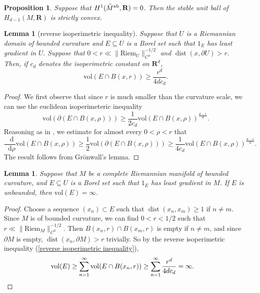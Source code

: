 \documentclass[reqno,11pt]{amsart}
\newcommand{\RR}{\mathbf{R}}
\newcommand*\dif{\mathop{}\!\mathrm{d}}
\DeclareMathOperator{\dist}{dist}
\newcommand{\vol}{\mathrm{vol}}
\newcommand{\Riem}{\mathrm{Riem}}
\newtheorem{lemma}[theorem]{Lemma}
\newtheorem{proposition}[theorem]{Proposition}
\theoremstyle{definition}
\numberwithin{equation}{section}
\begin{document}
\begin{proposition}\label{abelian cover condition}
Suppose that $H^1(\tilde M^{\rm ab}, \RR) = 0$. 
Then the stable unit ball of $H_{d - 1}(M, \RR)$ is strictly convex.
\end{proposition}

\begin{lemma}[reverse isoperimetric inequality]
Suppose that $U$ is a Riemannian domain of bounded curvature and $E \subseteq U$ is a Borel set such that $1_E$ has least gradient in $U$.
Suppose that $0 < r \ll \|\Riem_U\|_{C^0}^{-1/2}$ and $\dist(x, \partial U) > r$.
Then, if $c_d$ denotes the isoperimetric constant on $\RR^d$,
\begin{equation}\label{reverse isoperimetric inequality}
\vol(E \cap B(x, r)) \geq \frac{r^d}{4dc_d}.
\end{equation}
\end{lemma}
\begin{proof}
We first observe that since $r$ is much smaller than the curvature scale, we can use the euclidean isoperimeteric inequality 
$$\vol(\partial(E \cap B(x, \rho))) \geq \frac{1}{2c_d} \vol(E \cap B(x, \rho))^{\frac{d - 1}{d}}.$$
Reasoning as in \cite[Proposition 5.14]{Giusti77}, we estimate for almost every $0 < \rho < r$ that
$$\frac{\dif}{\dif \rho} \vol(E \cap B(x, \rho)) \geq \frac{1}{2} \vol(\partial(E \cap B(x, \rho))) \geq \frac{1}{4c_d} \vol(E \cap B(x, \rho))^{\frac{d - 1}{d}}.$$
The result follows from Gr\"onwall's lemma.
\end{proof}

\begin{lemma}\label{unbounded implies infinite measure}
Suppose that $M$ be a complete Riemannian manifold of bounded curvature, and $E \subseteq U$ is a Borel set such that $1_E$ has least gradient in $M$.
If $E$ is unbounded, then $\vol(E) = \infty$.
\end{lemma}
\begin{proof}
Choose a sequence $(x_n) \subset E$ such that $\dist(x_n, x_m) \geq 1$ if $n \neq m$.
Since $M$ is of bounded curvature, we can find $0 < r < 1/2$ such that $r \ll \|\Riem_M\|_{C^0}^{-1/2}$.
Then $B(x_n, r) \cap B(x_m, r)$ is empty if $n \neq m$, and since $\partial M$ is empty, $\dist(x_n, \partial M) > r$ trivially.
So by the reverse isoperimetric inequality (\ref{reverse isoperimetric inequality}),
\begin{align*}
\vol(E) &\geq \sum_{n=1}^\infty \vol(E \cap B(x_n, r)) \geq \sum_{n=1}^\infty \frac{r^d}{4dc_d} = \infty. \qedhere 
\end{align*}
\end{proof}
\end{document}
